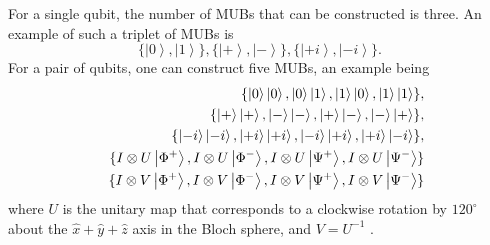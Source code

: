 \documentclass[pra,nofootinbib,showpacs,12pt]{revtex4}
\begin{document}
For a single qubit, the number of MUBs that can be constructed is three. An
example of such a triplet of MUBs is
\begin{equation}
\{\left| 0\right\rangle ,\left| 1\right\rangle \},\{\left| +\right\rangle
,\left| -\right\rangle \},\{\left| +i\right\rangle ,\left| -i\right\rangle
\}.
\end{equation}
For a pair of qubits, one can construct five MUBs, an example being
\begin{eqnarray}
&&\{\left| 0\right\rangle \left| 0\right\rangle ,\left| 0\right\rangle
\left| 1\right\rangle ,\left| 1\right\rangle \left| 0\right\rangle ,\left|
1\right\rangle \left| 1\right\rangle \},  \notag \\
&&\{\left| +\right\rangle \left| +\right\rangle ,\left| -\right\rangle
\left| -\right\rangle ,\left| +\right\rangle \left| -\right\rangle ,\left|
-\right\rangle \left| +\right\rangle \},  \notag \\
&&\{\left| -i\right\rangle \left| -i\right\rangle ,\left| +i\right\rangle
\left| +i\right\rangle ,\left| -i\right\rangle \left| +i\right\rangle
,\left| +i\right\rangle \left| -i\right\rangle \},  \notag \\
&&\{I\otimes U\left| \Phi ^{+}\right\rangle ,I\otimes U\left| \Phi
^{-}\right\rangle ,I\otimes U\left| \Psi ^{+}\right\rangle ,I\otimes U\left|
\Psi ^{-}\right\rangle \}  \notag \\
&&\{I\otimes V\left| \Phi ^{+}\right\rangle ,I\otimes V\left| \Phi
^{-}\right\rangle ,I\otimes V\left| \Psi ^{+}\right\rangle ,I\otimes V\left|
\Psi ^{-}\right\rangle \}  \notag \\
\end{eqnarray}
where $U$ is the unitary map that corresponds to a clockwise rotation by $%
120^{\circ }$ about the $\hat{x}+\hat{y}+\hat{z}$ axis in the Bloch sphere,
and $V=U^{-1}$ \cite{WoottersWignerfunctions}.
\end{document}
